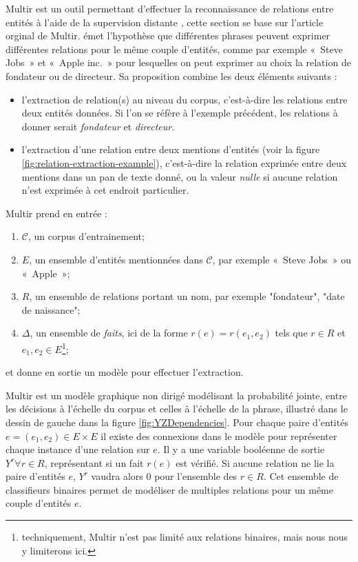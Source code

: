 \documentclass[PhD-Yoann-Dupont.tex]{subfiles}
\begin{document}
Multir \citep{hoffmann2011knowledge} est un outil permettant d'effectuer la reconnaissance de relations entre entités à l'aide de la supervision distante \citep{mintz2009distant}, cette section se base sur l'article orginal de Multir. \citet{hoffmann2011knowledge} émet l'hypothèse que différentes phrases peuvent exprimer différentes relations pour le même couple d'entités, comme par exemple «\ Steve Jobs\ » et «\ Apple inc.\ » pour lesquelles on peut exprimer au choix la relation de fondateur ou de directeur. Sa proposition combine les deux éléments suivants :

\begin{itemize}
\item l'extraction de relation(s) au niveau du corpus, c'est-à-dire les relations entre deux entités données. Si l'on se réfère à l'exemple précédent, les relations à donner serait \emph{fondateur} et \emph{directeur}.
\item l'extraction d'une relation entre deux mentions d'entités (voir la figure \ref{fig:relation-extraction-example}), c'est-à-dire la relation exprimée entre deux mentions dans un pan de texte donné, ou la valeur \emph{nulle} si aucune relation n'est exprimée à cet endroit particulier.
\end{itemize}

Multir prend en entrée :
\begin{enumerate}
    \item $\mathcal{C}$, un corpus d'entrainement;
    \item $E$, un ensemble d'entités mentionnées dans $\mathcal{C}$, par exemple «\ Steve Jobs\ » ou «\ Apple\ »;
    \item $R$, un ensemble de relations portant un nom, par exemple "fondateur", "date de naissance";
    \item $\Delta$, un ensemble de \emph{faits}, ici de la forme $r(e) = r(e_{1},e_{2})$ tels que $r \in R$ et $e_{1},e_{2} \in E$\footnote{techniquement, Multir n'est pas limité aux relations binaires, mais nous nous y limiterons ici.};
\end{enumerate}
et donne en sortie un modèle pour effectuer l'extraction.

Multir est un modèle graphique non dirigé modélisant la probabilité jointe, entre les décisions à l'échelle du corpus et celles à l'échelle de la phrase, illustré dans le dessin de gauche dans la figure \ref{fig:YZDependencies}. Pour chaque paire d'entités $e = (e_{1},e_{2}) \in E \times E$ il existe des connexions dans le modèle pour représenter chaque instance d'une relation sur $e$. Il y a une variable booléenne de sortie $Y^{r} \forall r \in R$, représentant si un fait $r(e)$ est vérifié. Si aucune relation ne lie la paire d'entités $e$, $Y^{r}$ vaudra alors 0 pour l'ensemble des $r \in R$. Cet ensemble de classifieurs binaires permet de modéliser de multiples relations pour un même couple d'entités $e$.
\end{document}
